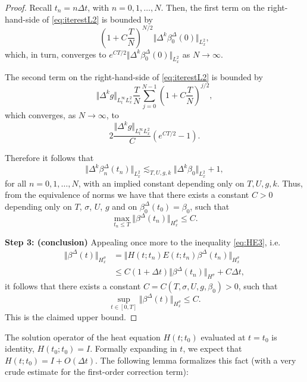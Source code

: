 \documentclass[reqno,12pt]{amsart}
\begin{document}
\begin{proof}
Recall $t_n=n\Delta t$, with $n=0, 1,\ldots,N$. Then, the first term on the right-hand-side of \eqref{eq:iterestL2} is bounded by
\[\left(1+C\frac{T}{N}\right)^{N/2} \Vert \Delta^k {\beta}_{0}^\Delta(0) \Vert_{L^2_x}, \]
which, in turn, converges to $e^{CT/2}\Vert \Delta^k {\beta}_{0}^\Delta(0) \Vert_{L^2_x}$ as $N\to \infty$.

The second term on the right-hand-side of \eqref{eq:iterestL2} is bounded by
\[\Vert \Delta^k g \Vert_{L^\infty_t L^2_x} \frac{T}{N} \sum_{j=0}^{N-1} \left(1+C\frac{T}{N}\right)^{j/2},\]
which converges, as $N\to\infty$, to
\[2\frac{\Vert \Delta^k g \Vert_{L^\infty_t L^2_x} }{C}(e^{CT/2}-1).\]

Therefore it follows that
\[\Vert \Delta^k{\beta}_{n}^\Delta(t_{n})\Vert_{L^2_x} \lesssim_{T,U,g,k}\Vert \Delta^k\beta_0\Vert_{L^2_x} + 1,\]
for all $n=0,1,\ldots,N$, with an implied constant depending only on $T, U, g,k$. Thus, from the equivalence of norms we have that there exists a constant $C>0$ depending only on $T$, $\sigma$, $U$, $g$ and on ${\beta}^\Delta_0(t_0) = \beta_0$, such that
\[
\max_{t_n \le T}
\Vert {\beta}^\Delta(t_n)\Vert_{H^\sigma_x}
\le
C.
\]



\textbf{Step 3: (conclusion)} Appealing once more to the inequality \eqref{eq:HE3}, i.e.
\begin{align*}
\Vert \beta^\Delta(t) \Vert_{H^\sigma_x}
&=
\Vert H(t;t_n) E(t;t_n) \beta^{\Delta}(t_n) \Vert_{H^\sigma_x}
\\
&\le
C(1+\Delta t)  \Vert \beta^\Delta(t_n) \Vert_{H^{\sigma}}
+
C \Delta t,
\end{align*}
it follows that there exists a constant $C = C(T,\sigma,U,g,\beta_0)>0$, such that
\[
\sup_{t\in [0,T]}
\Vert \beta^\Delta(t) \Vert_{H^\sigma_x} \le C.
\]
This is the claimed upper bound.
\end{proof}

The solution operator of the heat equation $H(t;t_0)$ evaluated at $t=t_0$ is identity, $H(t_0;t_0) = I$. Formally expanding in $t$, we expect that $H(t;t_0) = I + O(\Delta t)$.
The following lemma formalizes this fact (with a very crude estimate for the first-order correction term):
\end{document}
